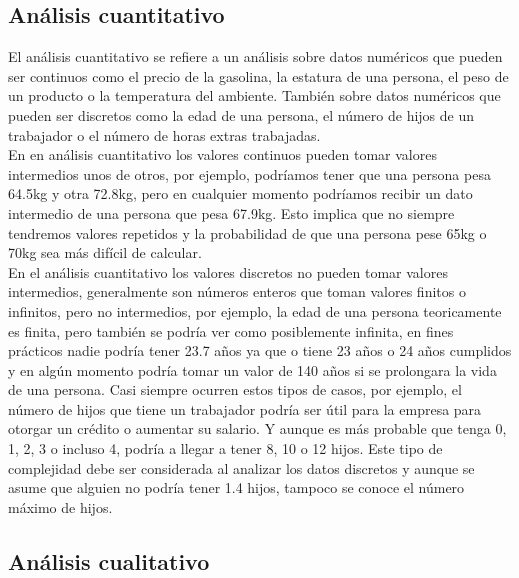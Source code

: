 \documentclass{article}
\begin{document}
\subsection{Análisis cuantitativo}

El análisis cuantitativo se refiere a un análisis sobre datos numéricos que pueden ser continuos como el precio de la gasolina, la estatura de una persona, el peso de un producto o la temperatura del ambiente. También sobre datos numéricos que pueden ser discretos como la edad de una persona, el número de hijos de un trabajador o el número de horas extras trabajadas.
\\[12pt]
En en análisis cuantitativo los valores continuos pueden tomar valores intermedios unos de otros, por ejemplo, podríamos tener que una persona pesa 64.5kg y otra 72.8kg, pero en cualquier momento podríamos recibir un dato intermedio de una persona que pesa 67.9kg. Esto implica que no siempre tendremos valores repetidos y la probabilidad de que una persona pese 65kg o 70kg sea más difícil de calcular.
\\[12pt]
En el análisis cuantitativo los valores discretos no pueden tomar valores intermedios, generalmente son números enteros que toman valores finitos o infinitos, pero no intermedios, por ejemplo, la edad de una persona teoricamente es finita, pero también se podría ver como posiblemente infinita, en fines prácticos nadie podría tener 23.7 años ya que o tiene 23 años o 24 años cumplidos y en algún momento podría tomar un valor de 140 años si se prolongara la vida de una persona. Casi siempre ocurren estos tipos de casos, por ejemplo, el número de hijos que tiene un trabajador podría ser útil para la empresa para otorgar un crédito o aumentar su salario. Y aunque es más probable que tenga 0, 1, 2, 3 o incluso 4, podría a llegar a tener 8, 10 o 12 hijos. Este tipo de complejidad debe ser considerada al analizar los datos discretos y aunque se asume que alguien no podría tener 1.4 hijos, tampoco se conoce el número máximo de hijos.

\subsection{Análisis cualitativo}
\end{document}
